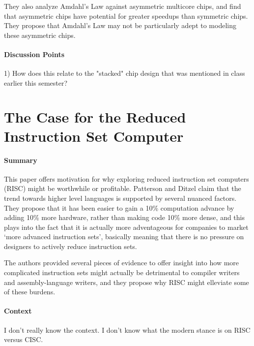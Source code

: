 They also analyze Amdahl's Law against asymmetric multicore chips, and find
that asymmetric chips have potential for greater speedups than symmetric
chips. They propose that Amdahl's Law may not be particularly adept to
modeling these asymmetric chips.
\paragraph{\textbf{Discussion Points}}
1) How does this relate to the "stacked" chip design that was mentioned in
class earlier this semester?


\section {The Case for the Reduced Instruction Set Computer
\cite{patterson1980case}}

\paragraph{\textbf{Summary}}
This paper offers motivation for why exploring reduced instruction set computers
(RISC) might be worthwhile or profitable. Patterson and Ditzel claim that the
trend towards higher level languages is supported by several nuanced factors.
They propose that it has been easier to gain a 10\% computation advance by
adding 10\% more hardware, rather than making code 10\% more dense, and this
plays into the fact that it is actually more adventageous for companies to
market `more advanced instruction sets', basically meaning that there is no
pressure on designers to actively reduce instruction sets.

The authors provided several pieces of evidence to offer insight into how more
complicated instruction sets might actually be detrimental to compiler writers
and assembly-language writers, and they propose why RISC might elleviate some of
these burdens.
\paragraph{\textbf{Context}}
I don't really know the context. I don't know what the modern stance is on RISC
versus CISC.
